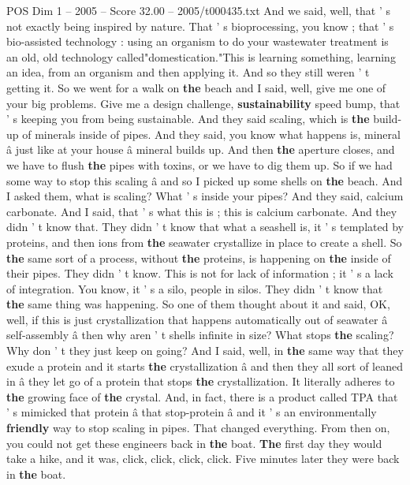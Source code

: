 \begin{textsample}{POS Dim 1 – 2005 – Score 32.00 – 2005/t000435.txt}
And we said, well, that ' s not exactly being inspired by nature.
That ' s bioprocessing, you know ; that ' s bio-assisted technology : using an organism to do your wastewater treatment is an old, old technology called"domestication."This is learning something, learning an idea, from an organism and then applying it.
And so they still weren ' t getting it.
So we went for a walk on \textbf{the} beach and I said, well, give me one of your big problems.
Give me a design challenge, \textbf{sustainability} speed bump, that ' s keeping you from being sustainable.
And they said scaling, which is \textbf{the} build-up of minerals inside of pipes.
And they said, you know what happens is, mineral â just like at your house â mineral builds up.
And then \textbf{the} aperture closes, and we have to flush \textbf{the} pipes with toxins, or we have to dig them up.
So if we had some way to stop this scaling â and so I picked up some shells on \textbf{the} beach.
And I asked them, what is scaling?
What ' s inside your pipes?
And they said, calcium carbonate.
And I said, that ' s what this is ; this is calcium carbonate.
And they didn ' t know that.
They didn ' t know that what a seashell is, it ' s templated by proteins, and then ions from \textbf{the} seawater crystallize in place to create a shell.
So \textbf{the} same sort of a process, without \textbf{the} proteins, is happening on \textbf{the} inside of their pipes.
They didn ' t know.
This is not for lack of information ; it ' s a lack of integration.
You know, it ' s a silo, people in silos.
They didn ' t know that \textbf{the} same thing was happening.
So one of them thought about it and said, OK, well, if this is just crystallization that happens automatically out of seawater â self-assembly â then why aren ' t shells infinite in size?
What stops \textbf{the} scaling?
Why don ' t they just keep on going?
And I said, well, in \textbf{the} same way that they exude a protein and it starts \textbf{the} crystallization â and then they all sort of leaned in â they let go of a protein that stops \textbf{the} crystallization.
It literally adheres to \textbf{the} growing face of \textbf{the} crystal.
And, in fact, there is a product called TPA that ' s mimicked that protein â that stop-protein â and it ' s an environmentally \textbf{friendly} way to stop scaling in pipes.
That changed everything.
From then on, you could not get these engineers back in \textbf{the} boat. \textbf{The} first day they would take a hike, and it was, click, click, click, click.
Five minutes later they were back in \textbf{the} boat.

\end{textsample}

